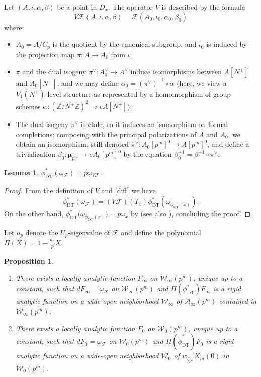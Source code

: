 \documentclass[a4paper,11pt]{amsart}
\numberwithin{equation}{section}
\theoremstyle{plain}
\newtheorem{proposition}[theorem]{Proposition}
\newtheorem{lemma}[theorem]{Lemma}
\theoremstyle{definition}
\theoremstyle{remark}
\newcommand{\Z}{\mathbb Z}
\begin{document}
Let $(A,\iota,\alpha,\beta)$ be a point in $D_x$. 
The operator $V$ is described by the formula
\[V\mathcal{F}(A,\iota,\alpha,\beta)=\mathcal{F}(A_0,\iota_0,\alpha_0,\beta_0)\] where:
\begin{itemize}
\item  
$A_0=A/C_p$ is the quotient by the canonical subgroup, and $\iota_0$ is induced by the projection map $\pi\colon A\rightarrow A_0$ from $\iota$;  
\item $\pi$ and the dual isogeny $\pi^\vee\colon A_0^\vee\rightarrow A^\vee$ induce isomorphisms between $A[N^+]$ and $A_0[N^+]$, and 
we may define $\alpha_0=(\pi^\vee)^{-1}\circ\alpha$ (here, we view a $V_1(N^+)$-level structure 
as represented by a homomorphism of group schemes $\alpha\colon(\Z/N^+\Z)^2\rightarrow eA[N^+]$); 
\item The dual isogeny $\pi^\vee$ is \'etale, so it induces an isomorphism on formal completions; composing 
with the principal polarizations of $A$ and $A_0$, we obtain an isomorphism, still denoted $\pi^\vee\colon A_0[p^m]^0\rightarrow A[p^m]^0$, 
and define a trivialization $\beta_0\colon\boldsymbol{\mu}_{p^m}\rightarrow eA_0[p^m]^0$ by the equation $\beta_0^{-1}=\beta^{-1}\circ\pi^\vee$. 
\end{itemize}

\begin{lemma}\label{lemma9.3} 
$\phi_{\mathrm{DT}}^*(\omega_{\mathcal{F}})=p\omega_{V\mathcal{F}}$. 
\end{lemma}

\begin{proof}
From the definition of $V$ and \eqref{diff} 
we have 
\[\phi_{\mathrm{DT}}^*(\omega_\mathcal{F}) 
=(V\mathcal{F})(T_x)\phi_{\mathrm{DT}}^*(\omega_{\bar\phi_{\mathrm{DT}} (x)}).\] On the other hand, $\phi_{\mathrm{DT}}^*\big(\omega_{\bar\phi_{\mathrm{DT}} (x)}\big)=p\omega_x$ by \cite[Lemma 3.5.1]{Kat} (see also \cite[Lemmas 4.4, 4.11]{Brooks}), concluding the proof.  
\end{proof}

Let $a_p$ denote the $U_p$-eigenvalue of $\mathcal{F}$ and  
define the polynomial $\Pi(X)=1-\frac{a_p}{p}X$.

\begin{proposition}\label{Col1}
\begin{enumerate} 
\item There exists a locally analytic function $F_{\infty}$ on $\mathcal{W}_\infty(p^m)$, unique up to a constant, such that $dF_{\infty}=\omega_\mathcal{F}$ on $\mathcal{W}_\infty(p^m)$ and  
$\Pi(\phi_{\mathrm{DT}}^*)F_{\infty}$ is a rigid analytic function on a wide-open neighborhood $\mathcal{W}_\infty$ of 
$\mathcal{A}_\infty(p^m)$ contained in $\mathcal{W}_\infty(p^m)$.  
\item There exists a locally analytic function $F_0$ on 
$\mathcal{W}_0(p^m)$, unique up to a constant, such that $dF_0=\omega_\mathcal{F}$ on $\mathcal{W}_0(p^m)$ and $\Pi(\tilde\phi_{\mathrm{DT}}^*)F_0$ is a rigid analytic function on a wide-open neighborhood $\mathcal{W}_0$ of $w_{\zeta_{p^m}}\widetilde X_m(0)$ in $\mathcal{W}_0(p^m)$.\end{enumerate}
\end{proposition} 
\end{document}
